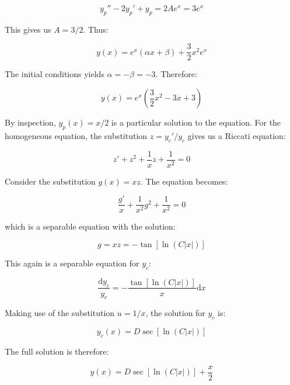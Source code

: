 \documentclass[12pt]{article}
\begin{document}
\begin{equation}
    y_{p}'' - 2y_{p}' + y_{p} = 2Ae^{x} = 3e^{x}
\end{equation}

This gives us $A = 3/2$. Thus:

\begin{equation}
    y(x) = e^{x}(\alpha x + \beta) + \frac{3}{2}x^{2}e^{x}
\end{equation}

The initial conditions yields $\alpha = -\beta = -3$. Therefore:

\begin{equation}
    y(x) = e^{x}\left( \frac{3}{2}x^{2} - 3x + 3 \right)
\end{equation}

By inspection, $y_{p}(x) = x/2$ is a particular solution to the equation. For the homogeneous equation, the substitution $z = y_{c}'/y_{c}$ gives us a Riccati equation:

\begin{equation}
    z' + z^{2} + \frac{1}{x} z + \frac{1}{x^{2}} = 0
\end{equation}

Consider the substitution $g(x) = xz$. The equation becomes:

\begin{equation}
    \frac{g'}{x} + \frac{1}{x^{2}} g^{2} + \frac{1}{x^{2}} = 0
\end{equation}

which is a separable equation with the solution:

\begin{equation}
    g = xz = -\tan{[\ln{(C\left\lvert x \right\rvert)}]}
\end{equation}

This again is a separable equation for $y_{c}$:

\begin{equation}
    \frac{\mathrm{d}y_{c}}{y_{c}} = -\frac{\tan{[\ln{(C\left\lvert x \right\rvert)}]}}{x} \mathrm{d}x
\end{equation}

Making use of the substitution $u = 1/x$, the solution for $y_{c}$ is:

\begin{equation}
    y_{c}(x) = D \sec{[\ln{(C\left\lvert x \right\rvert)}]}
\end{equation}

The full solution is therefore:

\begin{equation}
    y(x) = D \sec{[\ln{(C\left\lvert x \right\rvert)}]} + \frac{x}{2}
\end{equation}
\end{document}
